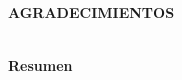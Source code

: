 \begin{flushright}
\begin{minipage}{8cm}
    \noindent
        \small
        \lipsum[0-1]
\end{minipage}
\end{flushright}


\newpage
\thispagestyle{empty} \textbf{}\normalsize
\\\\\\%
\textbf{AGRADECIMIENTOS}
\\\\
\lipsum[0-2]

\newpage{\pagestyle{empty}\cleardoublepage}

\newpage
\textbf{\LARGE Resumen}\\\\
\\\\
\lipsum[0-1]

